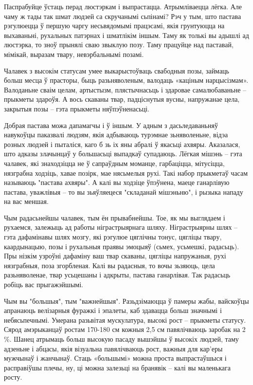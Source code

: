 Паспрабуйце ўстаць перад люстэркам і выпрастацца. Атрымліваецца лёгка. Але чаму ж тады так шмат людзей са скручанымі сьпінамі? Рэч у тым, што пастава рэгулюецца ў першую чаргу несьвядомымі працэсамі, якія грунтуюцца на выхаваньні, рухальных патэрнах і шматлікім іншым. Таму як толькі вы адышлі ад люстэрка, то зноў прынялі сваю звыклую позу. Таму працуйце над паставай, мімікай, выразам твару, невэрбальнымі позамі.

Чалавек з высокім статусам умее выкарыстоўваць свабодныя позы, займаць больш месца ў прасторы, быць разьняволеным, валодаць «каціным нарцысізмам». Валоданьне сваім целам, артыстызм, плястычнасьць і здаровае самалюбаваньне – прыкметы здароўя. А вось скаваны твар, падціснутыя вусны, напружанае цела, закрытыя позы – гэта прыкметы няўпэўненасьці.

Добрая пастава можа дапамагчы і ў іншым. У адным з дасьледаваньняў навукоўцы паказвалі людзям, якія адбываюць турэмнае зьняволеньне, відэа розных людзей і пыталіся, каго б зь іх яны абралі ў якасьці ахвяры. Аказалася, што адказы злачынцаў у большасьці выпадкаў супадаюць. Лёгкая мішэнь – гэта чалавек, які знаходзіцца не ў сапраўдным моманце, гарбаціцца, мітусіцца, нязграбна ходзіць, хавае позірк, мае нясьмелыя рухі. Такі набор прыкметаў часам называюць "пастава ахвяры". А калі вы ходзіце ўпэўнена, маеце ганарлівую пастава, уважлівыя – то вы зьяўляецеся "складанай мішэньню", і рызыка нападу на вас меншая.

Чым радасьнейшы чалавек, тым ён прывабнейшы. Тое, як мы выглядаем і рухаемся, залежыць ад работы ніграстрыярнага шляху. Ніграстрыярны шлях – гэта дафамінавы шлях мозгу, які рэгулюе цяглічны тонус, цягліцы твару, каардынацыю, позы і рухальныя праявы эмоцыяў (сьмех, усьмешкі, радасьць). Пры нізкім узроўні дафаміну ваш твар скаваны, цягліцы напружаныя, рухі нязграбныя, поза згорбленая. Калі вы радасныя, то вочы зьзяюць, цела разьняволенае, твар усьцешаны і адкрыты, пастава ганарлівая. Так радасьць робіць вас прыгажэйшымі.

Чым вы "большыя", тым "важнейшыя". Разьдзімаюцца ў памеры жабы, вайскоўцы апранаюць велізарныя фуражкі і эпалеты, каб здавацца больш значнымі і небясьпечнымі. Умерана разьвітая мускулатура, высокі рост – прыкметы статусу. Сярод амэрыканцаў ростам 170-180 см кожныя 2,5 см павялічваюць заробак на 2\,\%. Шанец атрымаць больш высокую пасаду вышэйшы ў высокіх людзей, таму адзеньне і абцасы, якія візуальна павялічваюць рост, важныя для кар'еры мужчынаў і жанчынаў. Стаць «большымі» можна проста выпрастаўшыся і расправіўшы плечы, ну, ці можна залезьці на бранявік – калі вы маленькага росту. 

